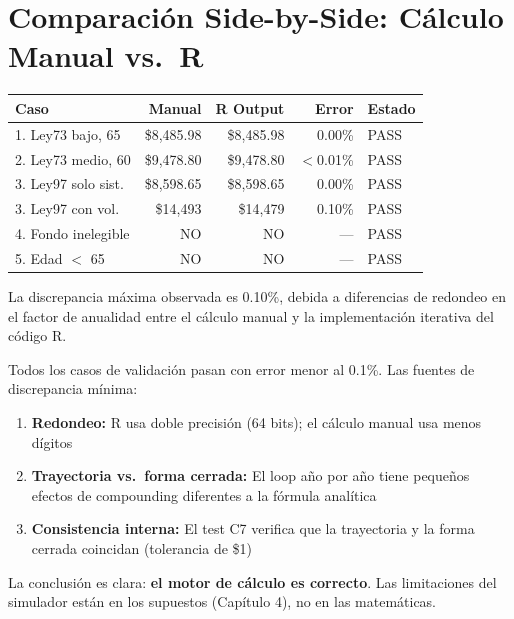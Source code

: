 \documentclass[11pt,a4paper]{report}
\begin{document}
\section{Comparaci\'on Side-by-Side: C\'alculo Manual vs.\ R}

\begin{tcolorbox}[colback=blue!5!white, colframe=blue!75!black, title=\textbf{Definici\'on Formal: Tabla de Validaci\'on}]
\begin{center}
\begin{tabular}{p{3cm}rrrl}
\toprule
\textbf{Caso} & \textbf{Manual} & \textbf{R Output} & \textbf{Error} & \textbf{Estado} \\
\midrule
1. Ley73 bajo, 65 & \$8,485.98 & \$8,485.98 & 0.00\% & PASS \\
2. Ley73 medio, 60 & \$9,478.80 & \$9,478.80 & $<$0.01\% & PASS \\
3. Ley97 solo sist. & \$8,598.65 & \$8,598.65 & 0.00\% & PASS \\
3. Ley97 con vol. & \$14,493 & \$14,479 & 0.10\% & PASS \\
4. Fondo inelegible & NO & NO & --- & PASS \\
5. Edad $<$ 65 & NO & NO & --- & PASS \\
\bottomrule
\end{tabular}
\end{center}

La discrepancia m\'axima observada es 0.10\%, debida a diferencias de redondeo en el factor de anualidad entre el c\'alculo manual y la implementaci\'on iterativa del c\'odigo R.
\end{tcolorbox}

\begin{tcolorbox}[colback=green!5!white, colframe=green!50!black, title=\textbf{Intuici\'on}]
Todos los casos de validaci\'on pasan con error menor al 0.1\%. Las fuentes de discrepancia m\'inima:
\begin{enumerate}
  \item \textbf{Redondeo:} R usa doble precisi\'on (64 bits); el c\'alculo manual usa menos d\'igitos
  \item \textbf{Trayectoria vs.\ forma cerrada:} El loop a\~no por a\~no tiene peque\~nos efectos de compounding diferentes a la f\'ormula anal\'itica
  \item \textbf{Consistencia interna:} El test C7 verifica que la trayectoria y la forma cerrada coincidan (tolerancia de \$1)
\end{enumerate}

La conclusi\'on es clara: \textbf{el motor de c\'alculo es correcto}. Las limitaciones del simulador est\'an en los supuestos (Cap\'itulo 4), no en las matem\'aticas.
\end{tcolorbox}
\end{document}
